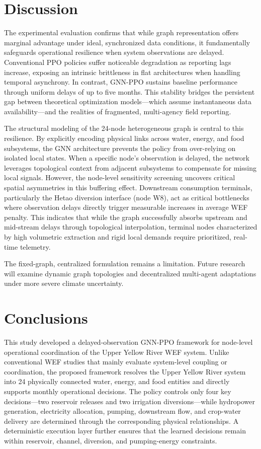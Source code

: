 \documentclass [a4paper,fleqn] {cas-dc}
\begin{document}
\section{Discussion} \label{sec5}

The experimental evaluation confirms that while graph representation offers marginal advantage under ideal, synchronized data conditions, it fundamentally safeguards operational resilience when system observations are delayed. Conventional PPO policies suffer noticeable degradation as reporting lags increase, exposing an intrinsic brittleness in flat architectures when handling temporal asynchrony. In contrast, GNN-PPO sustains baseline performance through uniform delays of up to five months. This stability bridges the persistent gap between theoretical optimization models—which assume instantaneous data availability—and the realities of fragmented, multi-agency field reporting.  

The structural modeling of the 24-node heterogeneous graph is central to this resilience. By explicitly encoding physical links across water, energy, and food subsystems, the GNN architecture prevents the policy from over-relying on isolated local states. When a specific node's observation is delayed, the network leverages topological context from adjacent subsystems to compensate for missing local signals. However, the node-level sensitivity screening uncovers critical spatial asymmetries in this buffering effect. Downstream consumption terminals, particularly the Hetao diversion interface (node W8), act as critical bottlenecks where observation delays directly trigger measurable increases in average WEF penalty. This indicates that while the graph successfully absorbs upstream and mid-stream delays through topological interpolation, terminal nodes characterized by high volumetric extraction and rigid local demands require prioritized, real-time telemetry.  

The fixed-graph, centralized formulation remains a limitation. Future research will examine dynamic graph topologies and decentralized multi-agent adaptations under more severe climate uncertainty.

\section{Conclusions}
\label{sec6}

This study developed a delayed-observation GNN-PPO framework for node-level operational coordination of the Upper Yellow River WEF system. Unlike conventional WEF studies that mainly evaluate system-level coupling or coordination, the proposed framework resolves the Upper Yellow River system into 24 physically connected water, energy, and food entities and directly supports monthly operational decisions. The policy controls only four key decisions—two reservoir releases and two irrigation diversions—while hydropower generation, electricity allocation, pumping, downstream flow, and crop-water delivery are determined through the corresponding physical relationships. A deterministic execution layer further ensures that the learned decisions remain within reservoir, channel, diversion, and pumping-energy constraints.
\end{document}
